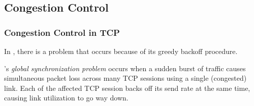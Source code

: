\subsection{Congestion Control}\label{subsec:Congestion_Control}

\subsubsection{Congestion Control in TCP}\label{subsubsec:Congestion_Control_TCP}
In , there is a problem that occurs because of its greedy backoff procedure.

\begin{definition}\label{def:TCP_Global_Synchronization_Problem}
  's \emph{global synchronization problem} occurs when a sudden burst of traffic causes simultaneous packet loss across many TCP sessions using a single (congested) link.
  Each of the affected TCP session backs off its send rate at the same time, causing link utilization to go way down.
\end{definition}

